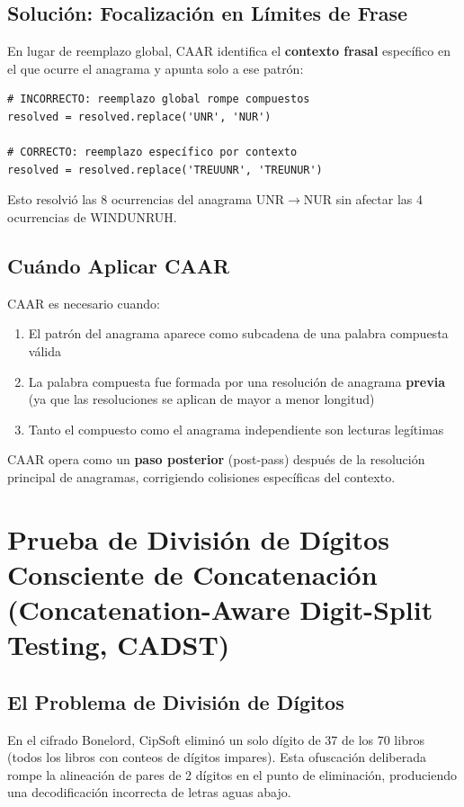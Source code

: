 \documentclass[11pt,a4paper]{article}
\begin{document}
\subsection{Solución: Focalización en Límites de Frase}

En lugar de reemplazo global, CAAR identifica el \textbf{contexto frasal} específico en el que ocurre el anagrama y apunta solo a ese patrón:

\begin{lstlisting}[style=python]
# INCORRECTO: reemplazo global rompe compuestos
resolved = resolved.replace('UNR', 'NUR')

# CORRECTO: reemplazo específico por contexto
resolved = resolved.replace('TREUUNR', 'TREUNUR')
\end{lstlisting}

Esto resolvió las 8 ocurrencias del anagrama UNR$\rightarrow$NUR sin afectar las 4 ocurrencias de WINDUNRUH.

\subsection{Cuándo Aplicar CAAR}

CAAR es necesario cuando:
\begin{enumerate}
\item El patrón del anagrama aparece como subcadena de una palabra compuesta válida
\item La palabra compuesta fue formada por una resolución de anagrama \textbf{previa} (ya que las resoluciones se aplican de mayor a menor longitud)
\item Tanto el compuesto como el anagrama independiente son lecturas legítimas
\end{enumerate}

CAAR opera como un \textbf{paso posterior} (post-pass) después de la resolución principal de anagramas, corrigiendo colisiones específicas del contexto.

\section{Prueba de División de Dígitos Consciente de Concatenación (Concatenation-Aware Digit-Split Testing, CADST)}

\subsection{El Problema de División de Dígitos}

En el cifrado Bonelord, CipSoft eliminó un solo dígito de 37 de los 70 libros (todos los libros con conteos de dígitos impares). Esta ofuscación deliberada rompe la alineación de pares de 2 dígitos en el punto de eliminación, produciendo una decodificación incorrecta de letras aguas abajo.
\end{document}
